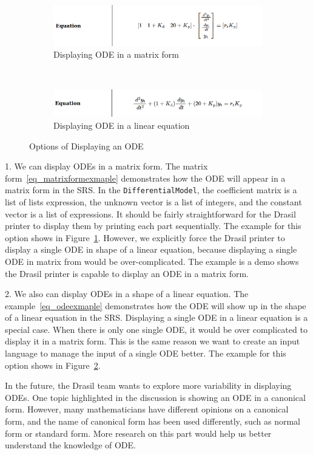 \begin{figure}[ht]
	\centering
	\begin{subfigure}[t]{\textwidth}
		\centering
		
\includegraphics[width=1\textwidth]{figures/ODEInMatrix.png}
		\caption{Displaying ODE in a matrix form}
		\label{fig_multienv_odematrix}
	\end{subfigure}
	~
	\begin{subfigure}[t]{\textwidth}
		\centering
	
\includegraphics[width=1\textwidth]{figures/ODEInLinearEq.png}
		\caption{Displaying ODE in a linear equation}
		\label{fig_multienv_odelinear}
	\end{subfigure}
	
	\caption{Options of Displaying an ODE}
	\label{fig_multienv}
\end{figure}

1. We can display ODEs in a matrix form. The matrix form~\ref{eq_matrixformexmaple} demonstrates how the ODE will appear in a matrix form in the SRS. In the \verb|DifferentialModel|, the coefficient matrix is a list of lists expression, the unknown vector is a list of integers, and the constant vector is a list of expressions. It should be fairly straightforward for the Drasil printer to display them by printing each part sequentially. The example for this option shows in Figure~\ref{fig_multienv_odematrix}. However, we explicitly force the Drasil printer to display a single ODE in shape of a linear equation, because displaying a single ODE in matrix from would be over-complicated. The example is a demo shows the Drasil printer is capable to display an ODE in a matrix form.

2. We also can display ODEs in a shape of a linear equation. The example~\ref{eq_odeexmaple} demonstrates how the ODE will show up in the shape of a linear equation in the SRS. Displaying a single ODE in a linear equation is a special case. When there is only one single ODE, it would be over complicated to display it in a matrix form. This is the same reason we want to create an input language to manage the input of a single ODE better. The example for this option shows in Figure~\ref{fig_multienv_odelinear}.

In the future, the Drasil team wants to explore more variability in displaying ODEs. One topic highlighted in the discussion is showing an ODE in a canonical form. However, many mathematicians have different opinions on a canonical form, and the name of canonical form has been used differently, such as normal form or standard form. More research on this part would help us better understand the knowledge of ODE.
